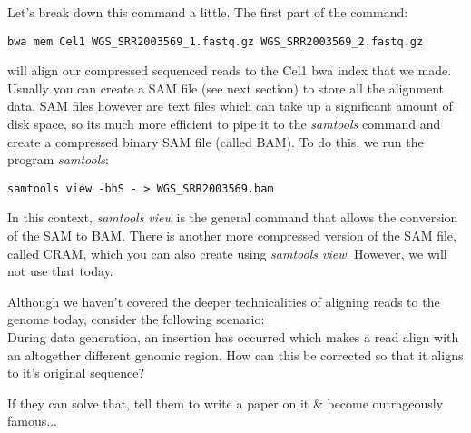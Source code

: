 Let's break down this command a little. The first part of the command:
\begin{lstlisting}[style=command_syntax]
bwa mem Cel1 WGS_SRR2003569_1.fastq.gz WGS_SRR2003569_2.fastq.gz
\end{lstlisting}
will align our compressed sequenced reads to the Cel1 bwa index that we made.
Usually you can create a SAM file (see next section) to store all the alignment data. SAM files however are text files which can take up a significant amount of disk space, so its much more efficient to pipe it to the \textit{samtools} command and create a compressed binary SAM file (called BAM).
To do this, we run the program \textit{samtools}:
\begin{lstlisting}[style=command_syntax]
samtools view -bhS - > WGS_SRR2003569.bam
\end{lstlisting}
In this context, \textit{samtools view} is the general command that allows the conversion of the SAM to BAM.
There is another more compressed version of the SAM file, called CRAM, which you can also create using \textit{samtools view}.
However, we will not use that today.

\begin{advanced}
\begin{questions}
Although we haven't covered the deeper technicalities of aligning reads to the genome today, consider the following scenario:\\

During data generation, an insertion has occurred which makes a read align with an altogether different genomic region.
How can this be corrected so that it aligns to it's original sequence? \\
\begin{answer}
If they can solve that, tell them to write a paper on it \& become outrageously famous...
\end{answer}
\end{questions}
\end{advanced}
